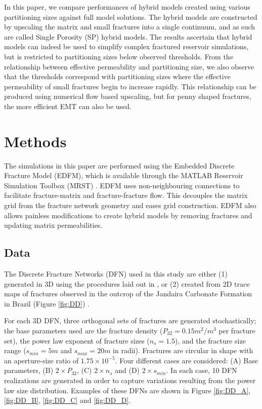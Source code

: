 \documentclass[a4paper]{article}
\begin{document}
In this paper, we compare performances of hybrid models created using various partitioning sizes against full model solutions. The hybrid models are constructed by upscaling the matrix and small fractures into a single continuum, and as such are called Single Porosity (SP) hybrid models. The results ascertain that hybrid models can indeed be used to simplify complex fractured reservoir simulations, but is restricted to partitioning sizes below observed thresholds. From the relationship between effective permeability and partitioning size, we also observe that the thresholds correspond with partitioning sizes where the effective permeability of small fractures begin to increase rapidly. This relationship can be produced using numerical flow based upscaling, but for penny shaped fractures, the more efficient EMT can also be used.

\section{Methods}
The simulations in this paper are performed using the Embedded Discrete Fracture Model (EDFM), which is available through the MATLAB Reservoir Simulation Toolbox (MRST) \citep{Lee2001, Lie2015, Moinfar2013}. EDFM uses non-neighbouring connections to facilitate fracture-matrix and fracture-fracture flow. This decouples the matrix grid from the fracture network geometry and eases grid construction. EDFM also allows painless modifications to create hybrid models by removing fractures and updating matrix permeabilities.

\subsection{Data}
The Discrete Fracture Networks (DFN) used in this study are either (1) generated in 3D using the procedures laid out in \citet{Priest1993}, or (2) created from 2D trace maps of fractures observed in the outcrop of the Jandaira Carbonate Formation in Brazil (Figure \ref{fig:DD}) \citep{Bisdom2017}.

For each 3D DFN, three orthogonal sets of fractures are generated stochastically; the base parameters used are the fracture density ($P_{32}=0.15m^2/m^3$ per fracture set), the power law exponent of fracture sizes ($n_s=1.5$), and the fracture size range ($s_{min}=5m$ and $s_{max}=20m$ in radii). Fractures are circular in shape with an aperture-size ratio of $1.75\times 10^{-5}$. Four different cases are considered: (A) Base parameters, (B) $2\times P_{32}$, (C) $2\times n_s$ and (D) $2\times s_{min}$. In each case, 10 DFN realizations are generated in order to capture variations resulting from the power law size distribution. Examples of these DFNs are shown in Figure \ref{fig:DD_A}, \ref{fig:DD_B}, \ref{fig:DD_C} and \ref{fig:DD_D}.
\end{document}

